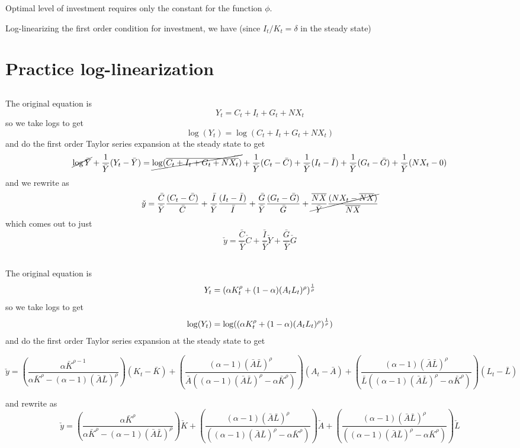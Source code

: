 \documentclass[11pt]{amsart}
\begin{document}
Optimal level of investment requires only the constant for the function $\phi$.

Log-linearizing the first order condition for investment, we have (since $I_t/K_t = \delta$ in the steady state)


\section{Practice log-linearization}

\subsection{}
The original equation is
\[
Y_t = C_t + I_t + G_t + NX_t
\]
so we take logs to get
\[
\log(Y_t) = \log(C_t + I_t + G_t + NX_t)
\]
and do the first order Taylor series expansion at the steady state to get
\[
\cancel{\log \bar{Y}} + \frac{1}{\bar{Y}} (Y_t - \bar{Y}) = \cancel{\log(\overline{C_t + I_t + G_t + NX_t})} + \frac{1}{\bar{Y}} (C_t - \bar{C}) + \frac{1}{\bar{Y}} (I_t - \bar{I}) + \frac{1}{\bar{Y}} (G_t - \bar{G}) + \frac{1}{\bar{Y}} (NX_t - 0)
\]
and we rewrite as 
\[
\check{y} = \frac{\bar{C}}{\bar{Y}} \frac{(C_t - \bar{C})}{\bar{C}} + \frac{\bar{I}}{\bar{Y}} \frac{(I_t - \bar{I})}{\bar{I}} + \frac{\bar{G}}{\bar{Y}} \frac{(G_t - \bar{G})}{\bar{G}} + \cancel{\frac{\overline{NX}}{\bar{Y}} \frac{(NX_t - \overline{NX})}{\overline{NX}}}
\]
which comes out to just
\[
\check{y} = \frac{\bar{C}}{\bar{Y}} \check{C} + \frac{\bar{I}}{\bar{Y}} \check{Y} + \frac{\bar{G}}{\bar{Y}} \check{G}
\]

\subsection{}
The original equation is
\[
Y_t = (\alpha K_t^{\rho} + (1-\alpha)(A_t L_t)^{\rho})^{1 \over \rho}
\]
so we take logs to get
\[
\log(Y_t) = \log((\alpha K_t^{\rho} + (1-\alpha)(A_t L_t)^{\rho})^{1 \over \rho})
\]
and do the first order Taylor series expansion at the steady state to get
\begin{tiny}
\[
\check{y}  = \left(\frac{\alpha  \bar{K}^{\rho -1}}{\alpha  \bar{K}^{\rho }-(\alpha -1) (\bar{A} \bar{L})^{\rho }}\right) (K_t - \bar{K}) + \left(\frac{(\alpha -1) (\bar{A} \bar{L})^{\rho }}{\bar{A} \left((\alpha -1) (\bar{A} \bar{L})^{\rho }-\alpha  \bar{K}^{\rho }\right)}\right) (A_t - \bar{A}) + \left(\frac{(\alpha -1) (\bar{A} \bar{L})^{\rho }}{\bar{L} \left((\alpha -1) (\bar{A} \bar{L})^{\rho }-\alpha  \bar{K}^{\rho }\right)}\right)(L_t - \bar{L})
\]
\end{tiny}
and rewrite as
\[
\check{y}  = \left(\frac{\alpha  \bar{K}^{\rho}}{\alpha  \bar{K}^{\rho }-(\alpha -1) (\bar{A} \bar{L})^{\rho }}\right) \check{K} + \left(\frac{(\alpha -1) (\bar{A} \bar{L})^{\rho }}{\left((\alpha -1) (\bar{A} \bar{L})^{\rho }-\alpha  \bar{K}^{\rho }\right)}\right) \check{A} + \left(\frac{(\alpha -1) (\bar{A} \bar{L})^{\rho }}{\left((\alpha -1) (\bar{A} \bar{L})^{\rho }-\alpha  \bar{K}^{\rho }\right)}\right) \check{L}
\]
\end{document}
